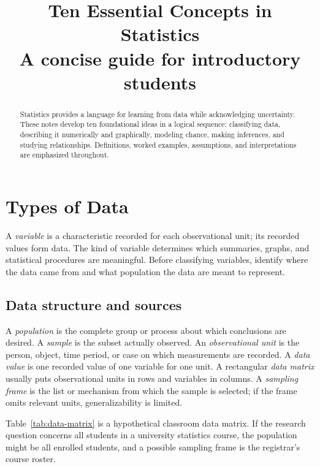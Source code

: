 \documentclass[11pt]{article}
\title{\textbf{Ten Essential Concepts in Statistics}\\[0.4em]
  \large A concise guide for introductory students}
\author{}
\date{}
\begin{document}
\maketitle

\begin{abstract}
Statistics provides a language for learning from data while acknowledging
uncertainty.  These notes develop ten foundational ideas in a logical
sequence: classifying data, describing it numerically and graphically,
modeling chance, making inferences, and studying relationships.  Definitions,
worked examples, assumptions, and interpretations are emphasized throughout.
\end{abstract}

\tableofcontents
\newpage

\section{Types of Data}\label{sec:data}
A \emph{variable} is a characteristic recorded for each observational unit;
its recorded values form data.  The kind of variable determines which
summaries, graphs, and statistical procedures are meaningful.  Before
classifying variables, identify where the data came from and what population
the data are meant to represent.

\subsection{Data structure and sources}
A \emph{population} is the complete group or process about which conclusions
are desired.  A \emph{sample} is the subset actually observed.  An
\emph{observational unit} is the person, object, time period, or case on
which measurements are recorded.  A \emph{data value} is one recorded value
of one variable for one unit.  A rectangular \emph{data matrix} usually puts
observational units in rows and variables in columns.  A \emph{sampling
frame} is the list or mechanism from which the sample is selected; if the
frame omits relevant units, generalizability is limited.

Table~\ref{tab:data-matrix} is a hypothetical classroom data matrix.  If the
research question concerns all students in a university statistics course,
the population might be all enrolled students, and a possible sampling frame
is the registrar's course roster.
\end{document}
